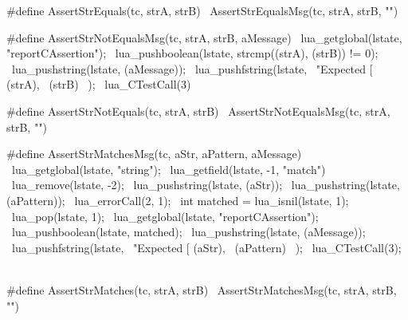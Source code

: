 #define AssertStrEquals(tc, strA, strB) \
  AssertStrEqualsMsg(tc, strA, strB, "")
\stopCHeader

\stopTestSuite

\startTestSuite[assertStrNotEquals]

\startCHeader
#define AssertStrNotEqualsMsg(tc, strA, strB, aMessage) \
  lua_getglobal(lstate, "reportCAssertion");            \
  lua_pushboolean(lstate, strcmp((strA), (strB)) != 0); \
  lua_pushstring(lstate, (aMessage));                   \
  lua_pushfstring(lstate,                               \
      "Expected [%
      (strA),                                           \
      (strB)                                            \
    );                                                  \
  lua_CTestCall(3)

#define AssertStrNotEquals(tc, strA, strB) \
  AssertStrNotEqualsMsg(tc, strA, strB, "")
\stopCHeader

\stopTestSuite

\startTestSuite[assertStrMatches]

\startCHeader
#define AssertStrMatchesMsg(tc, aStr, aPattern, aMessage) \
{                                                         \
  lua_getglobal(lstate, "string");                        \
  lua_getfield(lstate, -1, "match")                       \
  lua_remove(lstate, -2);                                 \
  lua_pushstring(lstate, (aStr));                         \
  lua_pushstring(lstate, (aPattern));                     \
  lua_errorCall(2, 1);                                    \
  int matched = lua_isnil(lstate, 1);                     \
  lua_pop(lstate, 1);                                     \
  lua_getglobal(lstate, "reportCAssertion");              \
  lua_pushboolean(lstate, matched);                       \
  lua_pushstring(lstate, (aMessage));                     \
  lua_pushfstring(lstate,                                 \
      "Expected [%
      (aStr),                                             \
      (aPattern)                                          \
    );                                                    \
  lua_CTestCall(3);                                       \
}

#define AssertStrMatches(tc, strA, strB) \
  AssertStrMatchesMsg(tc, strA, strB, "")
\stopCHeader

\stopTestSuite

\startTestSuite[assertStrNotMatch]

